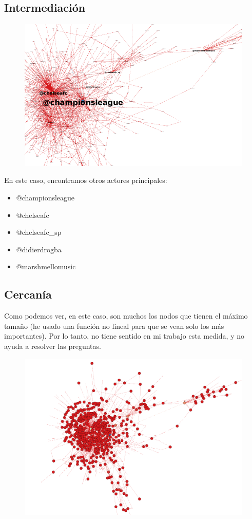 \subsection{Intermediación}
\begin{figure}[H]
	\centering
	\includegraphics[width=0.7\linewidth]{Imagenes/screenshot011}
\end{figure}

En este caso, encontramos otros actores principales:
\begin{itemize}
	\item @championsleague
	\item @chelseafc
	\item @chelseafc\_sp
	\item @didierdrogba
	\item @marshmellomusic
\end{itemize}

\newpage
\subsection{Cercanía}

Como podemos ver, en este caso, son muchos los nodos que tienen el máximo tamaño (he usado una función no lineal para que se vean solo los más importantes). Por lo tanto, no tiene sentido en mi trabajo esta medida, y no ayuda a resolver las preguntas.

\begin{figure}[H]
	\centering
	\includegraphics[width=0.7\linewidth]{Imagenes/screenshot012}
\end{figure}


